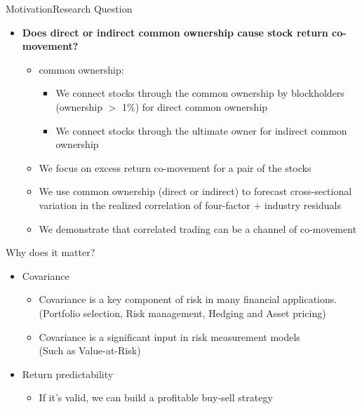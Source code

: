 \documentclass[handout]{beamer}
\begin{document}
	\begin{frame}{Motivation}{Research Question}
		
		\begin{itemize}
			\item\textbf{Does direct or indirect common ownership cause stock return co-movement?}
			\begin{itemize}
				\item common ownership:
				\begin{itemize}
					\item We connect stocks through the common ownership by blockholders (ownership $ > $ 1\%) for direct common ownership
					\item We connect stocks through the ultimate owner for indirect common ownership
				\end{itemize}
				\item We focus on excess return co-movement for a pair of the stocks
				\item We use common ownership (direct or indirect) to forecast cross-sectional variation in the realized correlation of four-factor + industry residuals
				\item We demonstrate that correlated trading can be a channel of co-movement
			\end{itemize}
		\end{itemize}
		
	\end{frame}
	
	\begin{frame}{Why does it matter?}
		\begin{itemize}
			\item Covariance
			\begin{itemize}
				\item Covariance is a key component of risk in
				many financial applications.
				\scriptsize(Portfolio selection, Risk management, Hedging and Asset
				pricing)
				\small
				\item Covariance is a significant input in risk measurement models \\ \scriptsize(Such as Value-at-Risk)\small
				
			\end{itemize}
			\item Return predictability
			\begin{itemize}
				\item If it's valid, we can build a profitable buy-sell strategy
			\end{itemize}
		\end{itemize}
		
	\end{frame}
	
\end{document}
